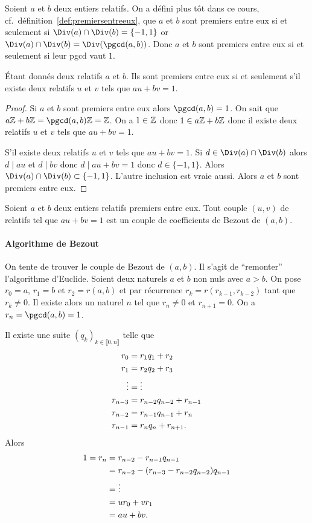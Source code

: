 Soient $a$ et $b$ deux entiers relatifs. On a défini plus tôt dans ce cours, cf.\ définition~\ref{def:premiersentreeux}, que $a$ et $b$ sont premiers entre eux si et seulement si $\Div(a) \cap \Div(b)=\{-1,1\}$ or $\Div(a) \cap \Div(b) = \Div(\pgcd(a,b))$. Donc $a$ et $b$ sont premiers entre eux si et seulement si leur pgcd vaut $1$.

\begin{theo}
  Étant donnés deux relatifs $a$ et $b$. Ils sont premiers entre eux si et seulement s'il existe deux relatifs $u$ et $v$ tels que $au+bv=1$.
\end{theo}
\begin{proof}
  Si $a$ et $b$ sont premiers entre eux alors $\pgcd(a,b) =1$. %
  On sait que $a\Z+b\Z=\pgcd(a,b)\Z=\Z$. On a $1 \in \mathbb{Z}$ donc $1 \in a\mathbb{Z}+b\mathbb{Z}$ donc il existe deux relatifs $u$ et $v$ tels que $au+bv=1$.

  S'il existe deux relatifs $u$ et $v$ tels que $au+bv=1$. Si $d \in \Div(a) \cap \Div(b)$ alors $d \mid au$ et $d \mid bv$ donc $d \mid au+bv=1$ donc $d \in \{-1,1\}$. Alors $\Div(a) \cap \Div(b) \subset \{-1,1\}$. L'autre inclusion est vraie aussi. Alors $a$ et $b$ sont premiers entre eux.
\end{proof}

\begin{defdef}
  Soient $a$ et $b$ deux entiers relatifs premiers entre eux. Tout couple $(u,v)$ de relatifs tel que $au+bv=1$ est un couple de coefficients de Bezout de $(a,b)$.
\end{defdef}

\paragraph{Algorithme de Bezout}

On tente de trouver le couple de Bezout de $(a,b)$. Il s'agit de ``remonter'' l'algorithme d'Euclide. Soient deux naturels $a$ et $b$ non nuls avec $a>b$. On pose $r_0=a$, $r_1=b$ et $r_2=r(a,b)$ et par récurrence $r_k=r(r_{k-1}, r_{k-2})$ tant que $r_k \neq 0$. Il existe alors un naturel $n$ tel que $r_n \neq 0$ et $r_{n+1}=0$. On a $r_n=\pgcd(a,b)=1$.

Il existe une suite $(q_k)_{k \in \llbracket 0, n \rrbracket}$ telle que
\begin{align}
  r_0 &= r_1 q_1+r_2 \\
  r_1 &= r_2 q_2+r_3 \\
  \vdots &= \vdots \notag \\
  r_{n-3} &=r_{n-2} q_{n-2}+ r_{n-1} \\
  r_{n-2} &=r_{n-1} q_{n-1}+ r_{n} \\
  r_{n-1} &=r_{n} q_{n}+ r_{n+1}. 
\end{align}
Alors
\begin{align}
  1=r_n&=r_{n-2} -r_{n-1}q_{n-1} \\
  &=r_{n-2} - (r_{n-3} -r_{n-2}q_{n-2})q_{n-1}\\
  &= \vdots \notag \\
  &=ur_0 + vr_1\\
  &=au+bv.
\end{align}

